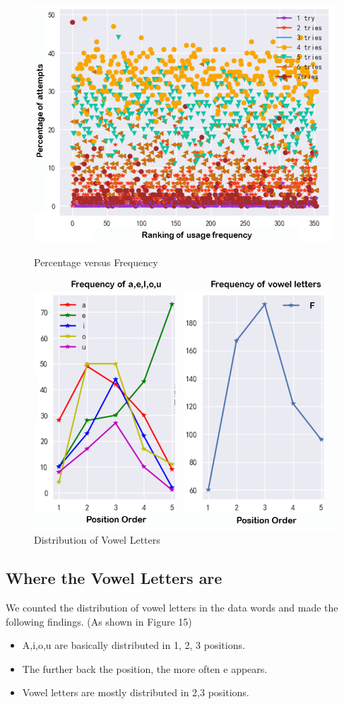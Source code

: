 \documentclass[12pt]{article}
\begin{document}
\begin{figure}[htbp]
	\centering
	\begin{minipage}{0.495\linewidth}
		\centering
		\includegraphics[width=0.9\linewidth]{4_3.png}
		\caption{Percentage versus Frequency}
    \end{minipage}
	\begin{minipage}{0.47\linewidth}
		\centering
		\includegraphics[width=0.9\linewidth]{4_4.png}
		\caption{Distribution of Vowel Letters}
	\end{minipage}
\end{figure}


\subsection{Where the Vowel Letters are }
We counted the distribution of vowel letters in the data words and made the following findings.
(As shown in Figure 15)
\begin{itemize}
     \item A,i,o,u are basically distributed in 1, 2, 3 positions.
     \item The further back the position, the more often e appears.
     \item Vowel letters are mostly distributed in 2,3 positions.
\end{itemize}
\end{document}
